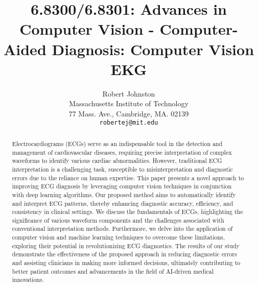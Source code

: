 \documentclass[10pt,twocolumn,letterpaper]{article}
\begin{document}
\title{6.8300/6.8301: Advances in Computer Vision - Computer-Aided Diagnosis: Computer Vision EKG}

\author{Robert Johnston\\
Massachusetts Institute of Technology\\
77 Mass. Ave., Cambridge, MA. 02139\\
{\tt\small robertej@mit.edu}
}
\maketitle

\begin{abstract}


Electrocardiograms (ECGs) serve as an indispensable tool in the detection and management of cardiovascular diseases, requiring precise interpretation of complex waveforms to identify various cardiac abnormalities. However, traditional ECG interpretation is a challenging task, susceptible to misinterpretation and diagnostic errors due to the reliance on human expertise. This paper presents a novel approach to improving ECG diagnosis by leveraging computer vision techniques in conjunction with deep learning algorithms. Our proposed method aims to automatically identify and interpret ECG patterns, thereby enhancing diagnostic accuracy, efficiency, and consistency in clinical settings. We discuss the fundamentals of ECGs, highlighting the significance of various waveform components and the challenges associated with conventional interpretation methods. Furthermore, we delve into the application of computer vision and machine learning techniques to overcome these limitations, exploring their potential in revolutionizing ECG diagnostics. The results of our study demonstrate the effectiveness of the proposed approach in reducing diagnostic errors and assisting clinicians in making more informed decisions, ultimately contributing to better patient outcomes and advancements in the field of AI-driven medical innovations.

\end{abstract}
\end{document}
